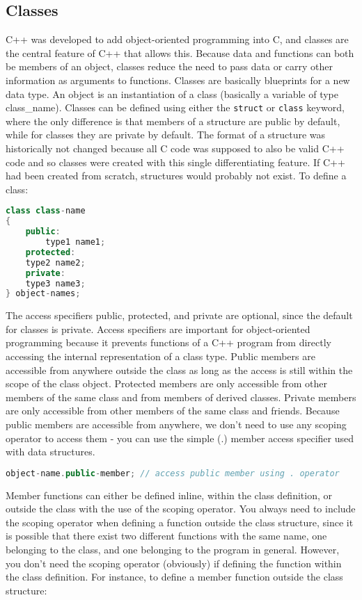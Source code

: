 \documentclass[10pt]{article}
\begin{document}
\subsection{Classes}

C++ was developed to add object-oriented programming into C, and classes are the central feature of C++ that allows this. Because data and functions can both be members of an object, classes reduce the need to pass data or carry other information as arguments to functions. Classes are basically blueprints for a new data type. An object is an instantiation of a class (basically a variable of type class\_name). Classes can be defined using either the \texttt{struct} or \texttt{class} keyword, where the only difference is that members of a structure are public by default, while for classes they are private by default. The format of a structure was historically not changed because all C code was supposed to also be valid C++ code and so classes were created with this single differentiating feature. If C++ had been created from scratch, structures would probably not exist. To define a class:

\begin{lstlisting}[language=C++]
class class-name
{
    public:
        type1 name1;
    protected:
	type2 name2;
    private:
	type3 name3;
} object-names;
\end{lstlisting}

The access specifiers public, protected, and private are optional, since the default for classes is private. Access specifiers are important for object-oriented programming because it prevents functions of a C++ program from directly accessing the internal representation of a class type. Public members are accessible from anywhere outside the class as long as the access is still within the scope of the class object. Protected members are only accessible from other members of the same class and from members of derived classes. Private members are only accessible from other members of the same class and friends. Because public members are accessible from anywhere, we don't need to use any scoping operator to access them - you can use the simple (.) member access specifier used with data structures.

\begin{lstlisting}[language=C++]
object-name.public-member; // access public member using . operator
\end{lstlisting}

Member functions can either be defined inline, within the class definition, or outside the class with the use of the scoping operator. You always need to include the scoping operator when defining a function outside the class structure, since it is possible that there exist two different functions with the same name, one belonging to the class, and one belonging to the program in general. However, you don't need the scoping operator (obviously) if defining the function within the class definition. For instance, to define a member function outside the class structure:
\end{document}
